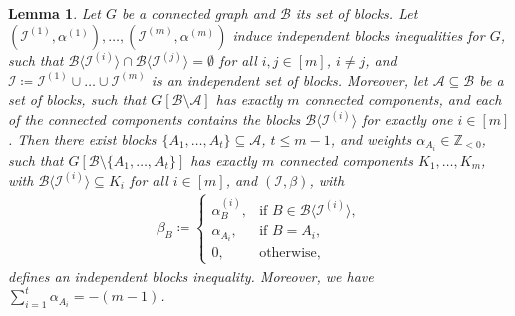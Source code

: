\documentclass[12pt]{amsart}
\newtheorem{lemma}[theorem]{Lemma}
\newcommand{\Z}{\mathbb{Z}}
\newcommand{\I}{\mathcal{I}}
\newcommand{\B}{\mathcal{B}}
\newcommand{\A}{\mathcal{A}}
\begin{document}
\begin{lemma}
\label{combining}
Let $G$ be a connected graph and $\B$ its set of blocks. Let $(\I^{(1)},\alpha^{(1)}), \ldots, (\I^{(m)},\alpha^{(m)})$ induce independent blocks inequalities for $G$, such that $\B\langle \I^{(i)}\rangle \cap \B\langle \I^{(j)}\rangle= \emptyset$ for all $i,j \in [m]$, $i \neq j$, and $\I \coloneqq \I^{(1)} \cup \ldots \cup \I^{(m)}$ is an independent set of blocks. Moreover, let $\A \subseteq \B$ be a set of blocks, such that $G[\B \setminus \A]$ has exactly $m$ connected components, and each of the connected components contains the blocks $\B\langle \I^{(i)} \rangle$ for exactly one $i \in [m]$. Then there exist blocks $\{A_1,\ldots,A_t\} \subseteq \A$, $t \le m-1$, and weights $\alpha_{A_i} \in \Z_{<0}$, such that $G[\B \setminus \{A_1,\ldots,A_t\}]$ has exactly $m$ connected components $K_1,\ldots,K_m$, with $\B\langle \I^{(i)} \rangle \subseteq K_i$ for all $i \in [m]$, and $(\I,\beta)$, with
\begin{align*}
    \beta_B \coloneqq \begin{cases} \alpha^{(i)}_B, &\text{if } B \in \B\langle \I^{(i)}\rangle, \\
                                    \alpha_{A_i}, &\text{if } B=A_i, \\
                                    0, &\text{otherwise},
    \end{cases}
\end{align*}
defines an independent blocks inequality. Moreover, we have $\sum_{i=1}^t \alpha_{A_i}=-(m-1)$.
\end{lemma}
\end{document}

